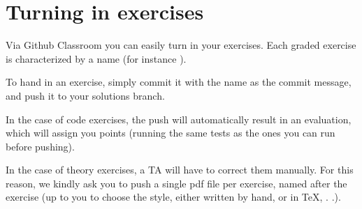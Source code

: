 
\section{Turning in exercises}\label{sec:handin_instructions}
Via Github Classroom you can easily turn in your exercises.
Each graded exercise is characterized by a name (for instance ).

To hand in an exercise, simply commit it with the name as the commit message, and push it to your solutions branch.

In the case of code exercises, the push will automatically result in an evaluation, which will assign you points (running the same tests as the ones you can run before pushing).

In the case of theory exercises, a TA will have to correct them manually.
For this reason, we kindly ask you to push a single pdf file per exercise, named after the exercise (up to you to choose the style, either written by hand, or in TeX, .
.).

